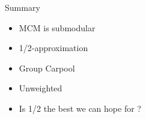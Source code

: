 \begin{frame}{Summary}
\begin{itemize}[<+>]
  \item MCM is submodular
  \item 1/2-approximation
  \item Group Carpool
  \item Unweighted
  \item \color{red} Is 1/2 the best we can hope for ?
\end{itemize}
\end{frame}